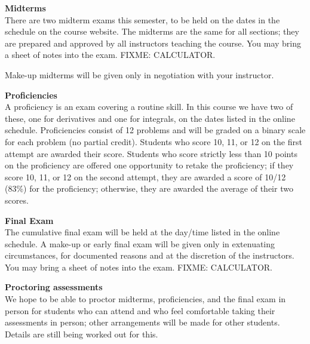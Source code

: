 \documentclass[12pt]{article}
\renewcommand{\emph}[1]{\textsf{\textbf{#1}}}
\newcommand{\localhead}[1]{\par\smallskip\textbf{#1}\nobreak\\}%
\def\heading#1{\localhead{\large\emph{#1}}}
\begin{document}
\heading{Midterms}
There are two midterm exams this semester, to be held on the dates in the schedule on the course website.  The midterms are the same for all sections; they are prepared and approved by all instructors teaching the course. You may bring a sheet of notes into the exam. FIXME: CALCULATOR.

Make-up midterms will be given only in negotiation with your instructor.

\heading{Proficiencies}
A proficiency is an exam covering a routine skill.  In this course we have two of these, one for derivatives and one for integrals, on the dates listed in the online schedule.  Proficiencies consist of 12 problems and will be graded on a binary scale for each problem (no partial credit). Students who score 10, 11, or 12 on the first attempt are awarded their score. Students who score strictly less than 10 points on the proficiency are offered one opportunity to retake the proficiency; if they score 10, 11, or 12 on the second attempt, they are awarded a score of 10/12 (83\%) for the proficiency; otherwise, they are awarded the average of their two scores.   %


\heading{Final Exam}
The cumulative final exam will be held at the day/time listed in the online schedule. A make-up or early final exam will be given only in extenuating circumstances, for documented reasons and at the discretion of the instructors.
You may bring a sheet of notes into the exam. FIXME: CALCULATOR.


\heading{Proctoring assessments}
We hope to be able to proctor midterms, proficiencies, and the final exam in person for students who can attend and who feel comfortable taking their assessments in person; other arrangements will be made for other students. Details are still being worked out for this.
\end{document}
